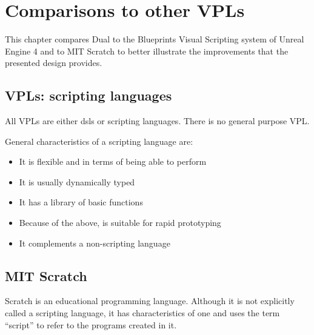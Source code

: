 \chapter{Comparisons to other VPLs}\label{chap:comp}
This chapter compares Dual to the Blueprints Visual Scripting system of Unreal Engine 4 and to MIT Scratch to better illustrate the improvements that the presented design provides.

\section{VPLs: scripting languages}
All VPLs are either \acrshort{dsl}s or scripting languages. There is no general purpose VPL\cite{general_vpl, no_general_vpl_hacker_news}.

General characteristics of a scripting language are\cite{scripting_langs, scripting_lang_wikipedia, c2_scripting_lang, perl_scripting}:
\begin{itemize}
    \item It is flexible and in terms of being able to perform
    \item It is usually dynamically typed
    \item It has a library of basic functions
    \item Because of the above, is suitable for rapid prototyping
    \item It complements a non-scripting language
\end{itemize}

\section{MIT Scratch}
Scratch is an educational programming language. Although it is not explicitly called a scripting language, it has characteristics of one and uses the term ``script'' to refer to the programs created in it\cite{script_scratch_wiki}.


